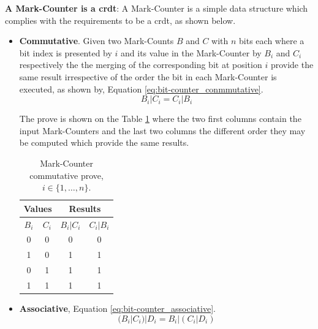 {\bf A Mark-Counter is a \gls{crdt}}: A Mark-Counter is a simple data structure which complies with the requirements to be a \gls{crdt}, as shown below.
\begin{itemize}
	\item {\bf Commutative}. Given two Mark-Counts $B$ and $C$ with $n$ bits each where a bit index is presented by $i$ and its value in the Mark-Counter by $B_{i}$ and $C_{i}$ respectively the the merging of the corresponding bit at position $i$ provide the same result irrespective of the order the bit in each Mark-Counter is executed, as shown by, Equation \ref{eq:bit-counter_conmmutative}.
		\begin{equation}
			B_{i} | C_{i} = C_{i} | B_{i}
			\label{eq:bit-counter_conmmutative}
		\end{equation}
		
		The prove is shown on the Table \ref{tab:bit-counter_conmmutative} where the two first columns contain the input Mark-Counters and the last two columns the different order they may be computed which provide the same results.
		\begin{table}[!ht]
			\centering
			\begin{tabular}{|c|c||c|c|}
				\hline
				\multicolumn{2}{|c||}{Values} & \multicolumn{2}{|c|}{Results} \\
				\hline
				$B_{i}$ & $C_{i}$ & $B_{i}|C_{i}$ & $C_{i}|B_{i}$ \\
				\hline
				\hline
				0         & 0          & 0                  & 0             \\
				\hline
				1         & 0          & 1                  & 1             \\
				\hline
				0         & 1          & 1                  & 1             \\
				\hline
				1         & 1          & 1                  & 1             \\
				\hline
			\end{tabular}
			
			\caption{Mark-Counter commutative prove, $i \in \{1,\dots, n\}$.}
			\label{tab:bit-counter_conmmutative}
		\end{table}

	\item {\bf Associative}, Equation \ref{eq:bit-counter_associative}.
		\begin{equation}
			(B_{i} | C_{i}) | D_{i} = B_{i} | (C_{i} | D_{i})
			\label{eq:bit-counter_associative}
		\end{equation}
		

\end{itemize}

